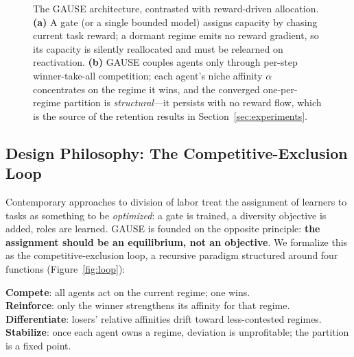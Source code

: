 \documentclass[10pt]{article}
\begin{document}
\begin{figure}[t]
\caption{The GAUSE architecture, contrasted with reward-driven
allocation. \textbf{(a)} A gate (or a single bounded model) assigns capacity by
chasing current task reward; a dormant regime emits no reward gradient, so its
capacity is silently reallocated and must be relearned on reactivation.
\textbf{(b)} GAUSE couples agents only through per-step
winner-take-all competition; each agent's niche affinity $\alpha$ concentrates
on the regime it wins, and the converged one-per-regime partition is
\emph{structural}---it persists with no reward flow, which is the source of the
retention results in Section~\ref{sec:experiments}.}
\label{fig:architecture}
\end{figure}

\subsection{Design Philosophy: The Competitive-Exclusion Loop}

Contemporary approaches to division of labor treat the assignment of learners to
tasks as something to be \emph{optimized}: a gate is trained, a diversity
objective is added, roles are learned. GAUSE is founded on the opposite
principle: \textbf{the assignment should be an equilibrium, not an objective}.
We formalize this as the competitive-exclusion loop, a recursive paradigm
structured around four functions (Figure~\ref{fig:loop}):

\begin{designbox}
\textbf{Compete}: all agents act on the current regime; one wins.\\
\textbf{Reinforce}: only the winner strengthens its affinity for that regime.\\
\textbf{Differentiate}: losers' relative affinities drift toward less-contested
regimes.\\
\textbf{Stabilize}: once each agent owns a regime, deviation is unprofitable;
the partition is a fixed point.
\end{designbox}
\end{document}
